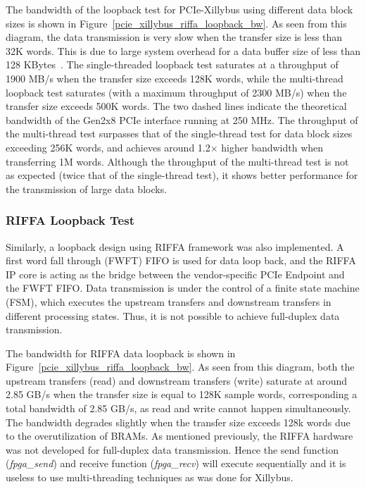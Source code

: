 The bandwidth of the loopback test for PCIe-Xillybus using different data block sizes is shown in Figure~\ref{pcie_xillybus_riffa_loopback_bw}. 
As seen from this diagram, the data transmission is very slow when the transfer size is less than 32K words. 
This is due to large system overhead for a data buffer size of less than 128 KBytes~\cite{xillybus2018}. 
The single-threaded loopback test saturates at a throughput of 1900 MB/s when the transfer size exceeds 128K words, while the multi-thread loopback test saturates (with a maximum throughput of 2300 MB/s) when the transfer size exceeds 500K words. 
The two dashed lines indicate the theoretical bandwidth of the Gen2x8 PCIe interface running at 250 MHz.
The throughput of the multi-thread test surpasses that of the single-thread test for data block sizes exceeding 256K words, and achieves around 1.2$\times$ higher bandwidth when transferring 1M words. 
Although the throughput of the multi-thread test is not as expected (twice that of the single-thread test), it shows better performance for the transmission of large data blocks. 



\subsubsection{RIFFA Loopback Test}
Similarly, a loopback design using RIFFA framework was also implemented. 
A first word fall through (FWFT) FIFO is used for data loop back, and the RIFFA IP core is acting as the bridge between the vendor-specific PCIe Endpoint and the FWFT FIFO. 
Data transmission is under the control of a finite state machine (FSM), which executes the upstream transfers and downstream transfers in different processing states.  
Thus, it is not possible to achieve full-duplex data transmission. 

The bandwidth for RIFFA data loopback is shown in Figure~\ref{pcie_xillybus_riffa_loopback_bw}. 
As seen from this diagram, both the upstream transfers (read) and downstream transfers (write) saturate at around 2.85 GB/s when the transfer size is equal to 128K sample words, corresponding a total bandwidth of 2.85 GB/s, as read and write cannot happen simultaneously. 
The bandwidth degrades slightly when the transfer size exceeds 128k words due to the overutilization of BRAMs.
As mentioned previously, the RIFFA hardware was not developed for full-duplex data transmission. 
Hence the send function (\textit{fpga\_send}) and receive function (\textit{fpga\_recv}) will execute sequentially and it is useless to use multi-threading techniques as was done for Xillybus. 

